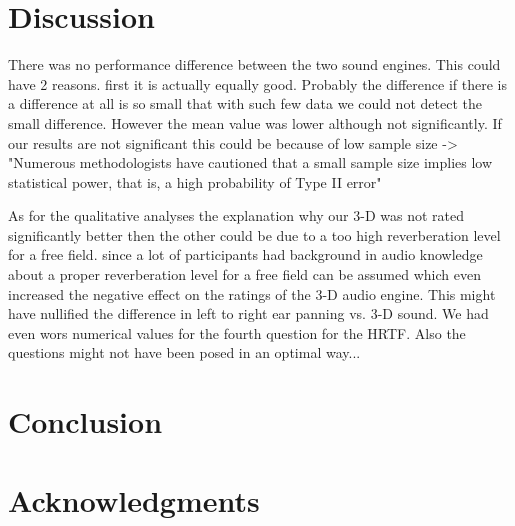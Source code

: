 \documentclass[journal]{IEEEtran}
\begin{document}
\section{Discussion}
There was no performance difference between the two sound engines. This could have 2 reasons. first it is actually equally good. Probably the difference if there is a difference at all is so small that with such few data we could not detect the small difference. However the mean value was lower although not significantly.
If our results are not significant this could be because of low sample size -> "Numerous methodologists have 
cautioned that a small sample size implies low statistical 
power, that is, a high probability of Type II error"~\cite{DeWinter2013}


As for the qualitative analyses the explanation why our 3-D was not rated significantly better then the other could be due to a too high reverberation level for a free field. since a lot of participants had background in audio knowledge about a proper reverberation level for a free field can be assumed which even increased the negative effect on the ratings of the 3-D audio engine. This might have nullified the difference in left to right ear panning vs. 3-D sound. We had even wors numerical values for the fourth question for the HRTF. Also the questions might not have been posed in an optimal way...



\section{Conclusion}




\section*{Acknowledgments}







\end{document}
